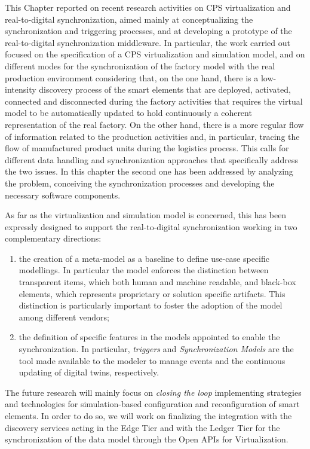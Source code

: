 
This Chapter reported on recent research activities on CPS virtualization and real-to-digital synchronization, aimed mainly at conceptualizing the synchronization and triggering processes, and at developing a prototype of the real-to-digital synchronization middleware.
In particular, the work carried out focused on the specification of a CPS virtualization and simulation model, and on different modes for the synchronization of the factory model with the real production environment considering that, on the one hand, there is a low-intensity discovery process of the smart elements that are deployed, activated, connected and disconnected during the factory activities that requires the virtual model to be automatically updated to hold continuously a coherent representation of the real factory. 
On the other hand, there is a more regular flow of information related to the production activities and, in particular, tracing the flow of manufactured product units during the logistics process. This calls for different data handling and synchronization approaches that specifically address the two issues. In this chapter the second one has been addressed by analyzing the problem, conceiving the synchronization processes and developing the necessary software components.

As far as the virtualization and simulation model is concerned, this has been expressly designed to support the real-to-digital synchronization working in two complementary directions:
\begin{enumerate}
    \item the creation of a meta-model as a baseline to define use-case specific modellings. In particular the model enforces the distinction between transparent items, which both human and machine readable, and black-box elements, which represents proprietary or solution specific artifacts. This distinction is particularly important to foster the adoption of the model among different vendors;
    \item the definition of specific features in the models appointed to enable the synchronization. In particular, \textit{triggers} and \textit{Synchronization Models} are the tool made available to the modeler to manage events and the continuous updating of digital twins, respectively. 
\end{enumerate}


The future research will mainly focus on \textit{closing the loop} implementing strategies and technologies for simulation-based configuration and reconfiguration of smart elements. In order to do so, we will work on finalizing the integration with the discovery services acting in the Edge Tier and with the Ledger Tier for the synchronization of the data model through the Open APIs for Virtualization.
